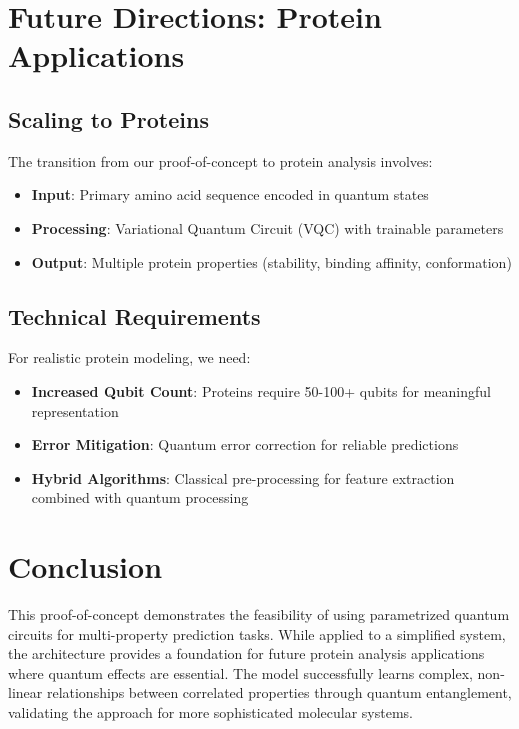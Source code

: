 \documentclass[11pt,a4paper]{article}
\begin{document}
\section{Future Directions: Protein Applications}

\subsection{Scaling to Proteins}

The transition from our proof-of-concept to protein analysis involves:

\begin{itemize}
    \item \textbf{Input}: Primary amino acid sequence encoded in quantum states
    \item \textbf{Processing}: Variational Quantum Circuit (VQC) with trainable parameters
    \item \textbf{Output}: Multiple protein properties (stability, binding affinity, conformation)
\end{itemize}

\subsection{Technical Requirements}

For realistic protein modeling, we need:
\begin{itemize}
    \item \textbf{Increased Qubit Count}: Proteins require 50-100+ qubits for meaningful representation
    \item \textbf{Error Mitigation}: Quantum error correction for reliable predictions
    \item \textbf{Hybrid Algorithms}: Classical pre-processing for feature extraction combined with quantum processing
\end{itemize}

\section{Conclusion}

This proof-of-concept demonstrates the feasibility of using parametrized quantum circuits for multi-property prediction tasks. While applied to a simplified system, the architecture provides a foundation for future protein analysis applications where quantum effects are essential. The model successfully learns complex, non-linear relationships between correlated properties through quantum entanglement, validating the approach for more sophisticated molecular systems.
\end{document}
